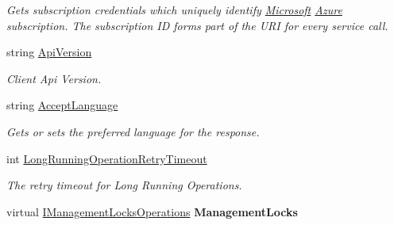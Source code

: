 \begin{DoxyCompactItemize}
\begin{DoxyCompactList}\small\item\em Gets subscription credentials which uniquely identify \hyperlink{namespace_microsoft}{Microsoft} \hyperlink{namespace_microsoft_1_1_azure}{Azure} subscription. The subscription ID forms part of the U\+RI for every service call. \end{DoxyCompactList}\item 
string \hyperlink{class_microsoft_1_1_azure_1_1_management_1_1_resources_1_1_authorization_client_a626224263775698e6f68e9d50abacaf6}{Api\+Version}
\begin{DoxyCompactList}\small\item\em Client Api Version. \end{DoxyCompactList}\item 
string \hyperlink{class_microsoft_1_1_azure_1_1_management_1_1_resources_1_1_authorization_client_a3eb96839bb67595814c900aa438998a4}{Accept\+Language}
\begin{DoxyCompactList}\small\item\em Gets or sets the preferred language for the response. \end{DoxyCompactList}\item 
int \hyperlink{class_microsoft_1_1_azure_1_1_management_1_1_resources_1_1_authorization_client_ac200a0c2a656262f534e5c9ea35d425b}{Long\+Running\+Operation\+Retry\+Timeout}
\begin{DoxyCompactList}\small\item\em The retry timeout for Long Running Operations. \end{DoxyCompactList}\item 
virtual \hyperlink{interface_microsoft_1_1_azure_1_1_management_1_1_resources_1_1_i_management_locks_operations}{I\+Management\+Locks\+Operations} {\bfseries Management\+Locks}\hypertarget{class_microsoft_1_1_azure_1_1_management_1_1_resources_1_1_authorization_client_aec78e71485f98316623712fbb9a218aa}{}\label{class_microsoft_1_1_azure_1_1_management_1_1_resources_1_1_authorization_client_aec78e71485f98316623712fbb9a218aa}

\end{DoxyCompactItemize}


